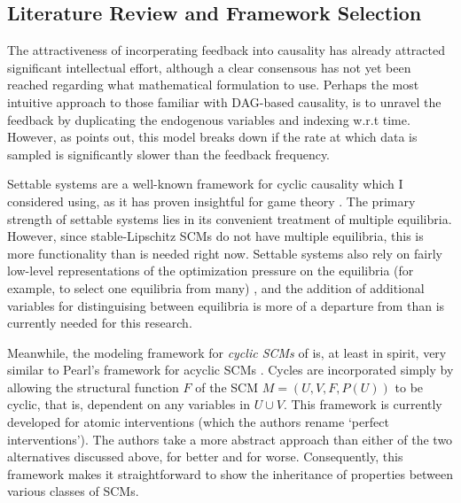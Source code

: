 \documentclass[letterpaper,10pt]{article}
\begin{document}
\subsection{Literature Review and Framework Selection}

The attractiveness of incorperating feedback into causality has already attracted significant intellectual effort, although a clear consensous has not yet been reached regarding what mathematical formulation to use. Perhaps the most intuitive approach to those familiar with DAG-based causality, is to unravel the feedback by duplicating the endogenous variables and indexing w.r.t time. However, as \cite{LearningLinear} points out, this model breaks down if the rate at which data is sampled is significantly slower than the feedback frequency. 

Settable systems are a well-known framework for cyclic causality \cite{White&Chalak} which I considered using, as it has proven insightful for game theory \cite{GameIncomplete}. The primary strength of settable systems lies in its convenient treatment of multiple equilibria. However, since stable-Lipschitz SCMs do not have multiple equilibria, this is more functionality than is needed right now. Settable systems also rely on fairly low-level representations of the optimization pressure on the equilibria (for example, to select one equilibria from many) \cite{CausalGames}, and the addition of additional variables for distinguising between equilibria is more of a departure from \cite{pearl_2009} than is currently needed for this research.

Meanwhile, the modeling framework for \emph{cyclic SCMs} of \cite{Foundations} is, at least in spirit, very similar to Pearl's framework for acyclic SCMs \cite{pearl_2009}.
Cycles are incorporated simply by allowing the structural function $F$ of the SCM $M=(U,V,F,P(U))$ to be cyclic, that is, dependent on any variables in $U\cup V$.
This framework is currently developed for atomic interventions (which the authors rename `perfect interventions').
The authors take a more abstract approach than either of the two alternatives discussed above, for better and for worse. Consequently, this framework makes it straightforward to show the inheritance of properties between various classes of SCMs.
\end{document}
